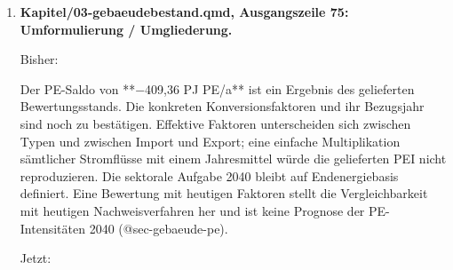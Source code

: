 \documentclass[
  ngerman,
  a4paper,
  DIV=11]{scrreprt}
\newenvironment{Shaded}{\begin{snugshade}}{\end{snugshade}}
\newcommand{\NormalTok}[1]{\textcolor[rgb]{0.00,0.23,0.31}{#1}}
\begin{document}
\begin{enumerate}
  Bisher:

\begin{Shaded}
\begin{Highlighting}[]
\NormalTok{Insbesondere die verbleibenden **76,67 PJ/a Gas** und **58,51 PJ/a Öl** zeigen, dass die gelieferte Flächen{-}/Versorgungsstruktur noch kein vollständig dekarbonisiertes Szenario darstellt. Diese Mengen werden weder als Strom behandelt noch aus der Bilanz entfernt. Die Anwendungsaufteilung der thermischen Energie steht in @sec{-}gebaeude{-}endenergie.}
\end{Highlighting}
\end{Shaded}

  Jetzt:

\begin{Shaded}
\begin{Highlighting}[]
\NormalTok{Insbesondere die verbleibenden **76,67 PJ/a Gas** und **58,51 PJ/a Öl** zeigen, dass die gelieferte Flächen{-}/Versorgungsstruktur kein vollständig dekarbonisiertes Szenario darstellt. Diese Mengen werden weder als Strom behandelt noch aus der Bilanz entfernt. Die Anwendungsaufteilung der thermischen Energie steht in @sec{-}gebaeude{-}endenergie.}
\end{Highlighting}
\end{Shaded}
\item
  \textbf{Kapitel/03-gebaeudebestand.qmd, Ausgangszeile 75:
  Umformulierung / Umgliederung.}

  Bisher:

\begin{Shaded}
\begin{Highlighting}[]
\NormalTok{Der PE{-}Saldo von **−409,36 PJ PE/a** ist ein Ergebnis des gelieferten Bewertungsstands. Die konkreten Konversionsfaktoren und ihr Bezugsjahr sind noch zu bestätigen. Effektive Faktoren unterscheiden sich zwischen Typen und zwischen Import und Export; eine einfache Multiplikation sämtlicher Stromflüsse mit einem Jahresmittel würde die gelieferten PEI nicht reproduzieren. Die sektorale Aufgabe 2040 bleibt auf Endenergiebasis definiert. Eine Bewertung mit heutigen Faktoren stellt die Vergleichbarkeit mit heutigen Nachweisverfahren her und ist keine Prognose der PE{-}Intensitäten 2040 (@sec{-}gebaeude{-}pe).}
\end{Highlighting}
\end{Shaded}

  Jetzt:


\end{enumerate}
\end{document}
